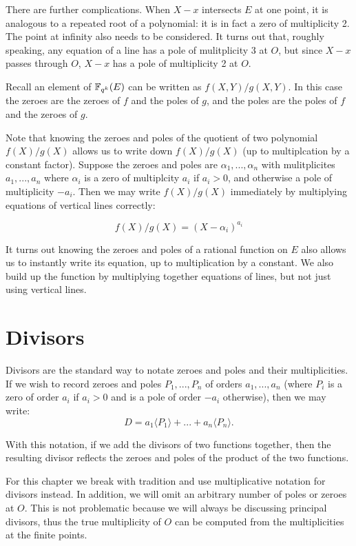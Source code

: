 There are further complications. When $X - x$ intersects $E$ at one point,
it is analogous to a repeated root of a polynomial: it is in
fact a zero of multiplicity 2. The point at infinity also needs to be
considered. It turns out that, roughly speaking, any equation of a line
has a pole of mulitplicity 3 at $O$, but since $X - x$ passes through $O$,
$X-x$ has a pole of multiplicity 2 at $O$.

Recall an element of $\mathbb{F}_{q^k}(E)$ can be written as $f(X,Y)/g(X,Y)$.
In this case the zeroes are the zeroes of $f$ and the poles of $g$,
and the poles are the poles of $f$ and the zeroes of $g$.

Note that knowing the zeroes and poles of the quotient of two
polynomial $f(X)/g(X)$ allows us to write down $f(X)/g(X)$ (up to multiplcation
by a constant factor). Suppose the zeroes and poles are $\alpha_1,...,\alpha_n$
with mulitplicites $a_1,...,a_n$ where $\alpha_i$ is a zero of multiplcity
$a_i$ if $a_i > 0$, and otherwise a pole of multiplicity $-a_i$. Then
we may write $f(X)/g(X)$ immediately by multiplying equations of
vertical lines correctly:

\[ f(X)/g(X) = (X-\alpha_i)^{a_i} \]

It turns out knowing the zeroes and poles of
a rational function on $E$ also allows us to instantly write its equation,
up to multiplication by a constant. We also build up the function by
multiplying together equations of lines, but not just using
vertical lines.

\section {Divisors}

Divisors are the standard way
to notate zeroes and poles and their multiplicities.
If we wish to record zeroes and poles $P_1,...,P_n$
of orders $a_1,...,a_n$ (where $P_i$ is a zero of order
$a_i$ if $a_i > 0$ and is a pole of order $-a_i$ otherwise), then
we may write:
\[ D = a_1\langle P_1\rangle + ... + a_n \langle P_n\rangle .\]

With this notation, if we add the divisors of two functions together,
then the resulting divisor reflects the zeroes and poles of the product
of the two functions.

For this chapter we break with tradition and use multiplicative
notation for divisors instead. In addition, we will omit an arbitrary
number of poles or zeroes at $O$. This is not problematic because we
will always be discussing principal divisors, thus the true multiplicity
of $O$ can be computed from the multiplicities at the finite points.

